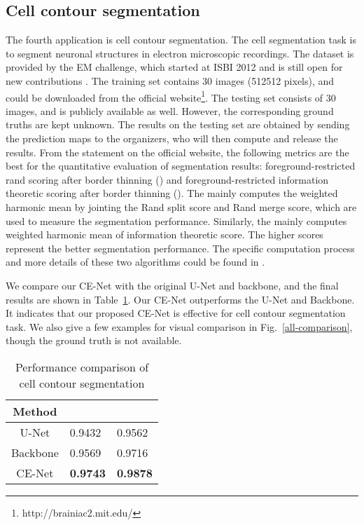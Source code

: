\documentclass[journal]{IEEEtran}
\begin{document}
\subsection{Cell contour segmentation}
The fourth application is cell contour segmentation.
  The cell segmentation task is to segment neuronal structures in electron microscopic recordings. The dataset is provided by the EM challenge, which started at ISBI 2012 and is still open for new contributions \cite{cardona2010integrated}. The training set contains 30 images (512512 pixels), and could be downloaded from the official website\footnote{http://brainiac2.mit.edu/}. 
The testing set consists of 30 images, and is publicly available as well. However, the corresponding ground truths are kept unknown. The results on the testing set are obtained by  sending the prediction maps to the organizers, who will then compute and release the results. From the statement on the official website, the following metrics are the best for the quantitative evaluation of segmentation results: foreground-restricted rand scoring after border thinning () and foreground-restricted information theoretic scoring after border thinning (). The  mainly computes the weighted harmonic mean by jointing the Rand split score and Rand merge score, which are used to measure the segmentation performance. Similarly, the  mainly computes weighted harmonic mean of information theoretic score. The higher scores represent the better segmentation performance. The specific computation process and more details of these two algorithms could be found in \cite{arganda2015crowdsourcing}.

We compare our CE-Net with the original U-Net and backbone, and the final results are shown in Table~\ref{cell}. Our CE-Net outperforms the U-Net and Backbone. It indicates that our proposed CE-Net is effective for cell contour segmentation task. We also give a few examples for visual comparison  in Fig.~\ref{all-comparison}, though the ground truth is not available.

\begin{table}[h] 
	\normalsize
	\caption{Performance comparison of cell contour segmentation} 
	\centering
\begin{tabular}{c|l|l}  \hline
Method  & \multicolumn{1}{c|}{} & \multicolumn{1}{c}{}                \\ \hline
U-Net \cite{ronneberger2015u}   & 0.9432                         & 0.9562                         \\ \hline
Backbone & 0.9569                         & 0.9716                                                     \\ \hline
CE-Net   & \textbf{0.9743}                & \textbf{0.9878}                                  \\ \hline
\end{tabular}
	\label{cell}
\end{table}
\end{document}

